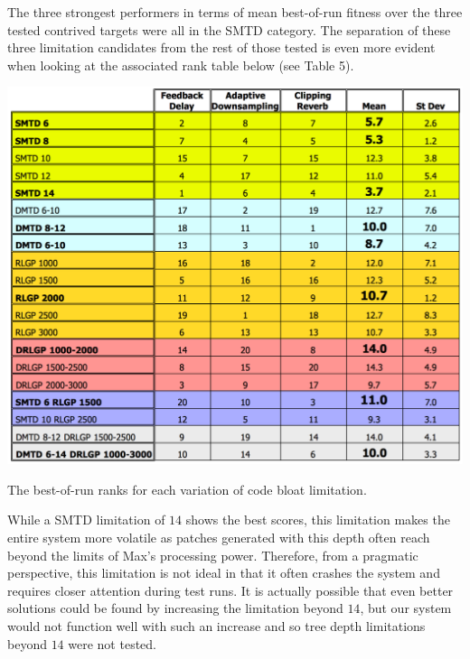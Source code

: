 \documentclass[12pt]{report} 	%
\numberwithin{figure}{chapter}
\numberwithin{table}{chapter}
\numberwithin{equation}{chapter}
\begin{document}
\begin{flushleft}
The three strongest performers in terms of mean best-of-run fitness over the three tested contrived targets were all in the SMTD category. The separation of these three limitation candidates from the rest of those tested is even more evident when looking at the associated rank table below (see Table 5).
\begin{table}[h!]
\begin{center}
\includegraphics[scale=0.6,width=\linewidth]{ResourceLimTable2}
\caption[Code bloat limitation best-of-run ranks]{The best-of-run ranks for each variation of code bloat limitation.}
\end{center}
\vspace{12pt}
\end{table}

While a SMTD limitation of $14$ shows the best scores, this limitation makes the entire system more volatile as patches generated with this depth often reach beyond the limits of Max's processing power. Therefore, from a pragmatic perspective, this limitation is not ideal in that it often crashes the system and requires closer attention during test runs. It is actually possible that even better solutions could be found by increasing the limitation beyond $14$, but our system would not function well with such an increase and so tree depth limitations beyond $14$ were not tested.


\end{flushleft}
\end{document}
